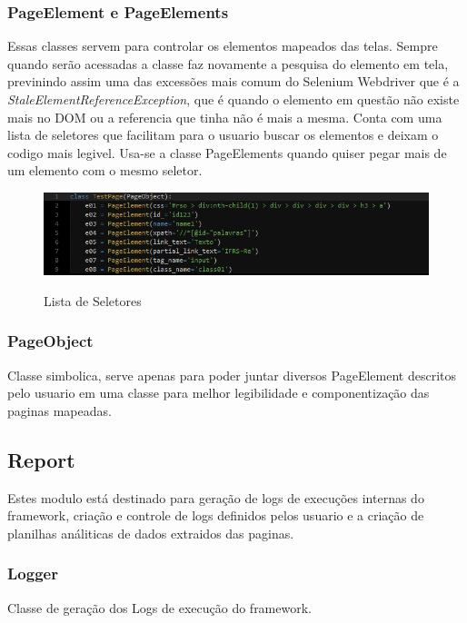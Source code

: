         \subsubsection{PageElement e PageElements}
        \label{PageElement}
            Essas classes servem para controlar os elementos mapeados das telas. Sempre quando serão acessadas a classe faz novamente a pesquisa
            do elemento em tela, previnindo assim uma das excessões mais comum do Selenium Webdriver que é a \emph{StaleElementReferenceException},
            que é quando o elemento em questão não existe mais no DOM ou a referencia que tinha não é mais a mesma. Conta com uma lista de seletores
            que facilitam para o usuario buscar os elementos e deixam o codigo mais legivel. Usa-se a classe PageElements quando quiser pegar mais
            de um elemento com o mesmo seletor.

            \begin{figure}[H]
                \vspace*{0,3cm}
                \centering
                \caption{Lista de Seletores}
                \includegraphics[width=1\textwidth]{./04-figuras/selectors}
                \label{fig:selectors.png}
            \end{figure}

        \subsubsection{PageObject}
            Classe simbolica, serve apenas para poder juntar diversos PageElement descritos pelo usuario em uma classe para melhor
            legibilidade e componentização das paginas mapeadas.

    \subsection{Report}

        Estes modulo está destinado para geração de logs de execuções internas do framework, criação e controle
        de logs definidos pelos usuario e a criação de planilhas análiticas de dados extraidos das paginas.

        \subsubsection{Logger}
        Classe de geração dos Logs de execução do framework.

